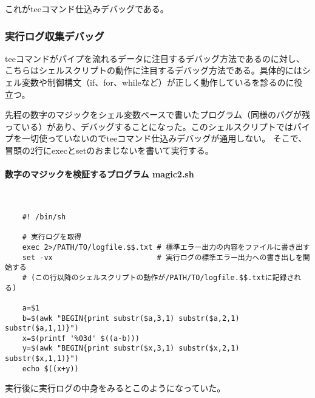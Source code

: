 これがteeコマンド仕込みデバッグである。

\subsubsection*{実行ログ収集デバッグ}

teeコマンドがパイプを流れるデータに注目するデバッグ方法であるのに対し、こちらはシェルスクリプトの動作に注目するデバッグ方法である。具体的にはシェル変数や制御構文（if、for、whileなど）が正しく動作しているを診るのに役立つ。

先程の数字のマジックをシェル変数ベースで書いたプログラム（同様のバグが残っている）があり、デバッグすることになった。このシェルスクリプトではパイプを一切使っていないのでteeコマンド仕込みデバッグが通用しない。
そこで、冒頭の2行にexecとsetのおまじないを書いて実行する。
\paragraph{数字のマジックを検証するプログラム magic2.sh} 　\\
\begin{frameboxit}{160.0mm}
\begin{verbatim}
	#! /bin/sh
	
	# 実行ログを取得
	exec 2>/PATH/TO/logfile.$$.txt # 標準エラー出力の内容をファイルに書き出す
	set -vx                        # 実行ログの標準エラー出力への書き出しを開始する
	# (この行以降のシェルスクリプトの動作が/PATH/TO/logfile.$$.txtに記録される)
	
	a=$1
	b=$(awk "BEGIN{print substr($a,3,1) substr($a,2,1) substr($a,1,1)}")
	x=$(printf '%03d' $((a-b)))
	y=$(awk "BEGIN{print substr($x,3,1) substr($x,2,1) substr($x,1,1)}")
	echo $((x+y))
\end{verbatim}
\end{frameboxit}
実行後に実行ログの中身をみるとこのようになっていた。
